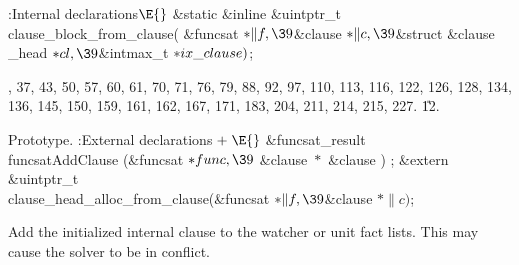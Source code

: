 \Y\B\4:Internal declarations\X${}\E{}$\6
\&{static} \&{inline} \&{uintptr\_t} \\{clause\_block\_from\_clause}(%
\&{funcsat} ${}{*}\|f,\39{}$\&{clause} ${}{*}\|c,\39{}$\&{struct} \&{clause%
\_head} ${}{*}\\{cl},\39{}$\&{intmax\_t} ${}{*}\\{ix\_clause}){}$;\par
{}, 37, 43, 50, 57, 60, 61, 70, 71, 76, 79, 88, 92, 97, 110, 113, 116, 122,
126, 128, 134, 136, 145, 150, 159, 161, 162, 167, 171, 183, 204, 211, 214, 215,
227.
\U12.\fi

Prototype.
\Y\B\4:External declarations\X${}\mathrel+\E{}$\6
\&{funcsat\_result}  \\{funcsatAddClause} (\&{funcsat} ${}{*}\\{func},\39$ %
\&{clause} ${}{*}{}$\1\1 \&{clause} )  ;\7
\&{extern} \&{uintptr\_t} \\{clause\_head\_alloc\_from\_clause}(\&{funcsat}
${}{*}\|f,\39{}$\&{clause} ${}{*}\|c){}$;\par
\fi

Add the initialized internal clause to the watcher or unit fact lists.
This
may cause the solver to be in conflict.

